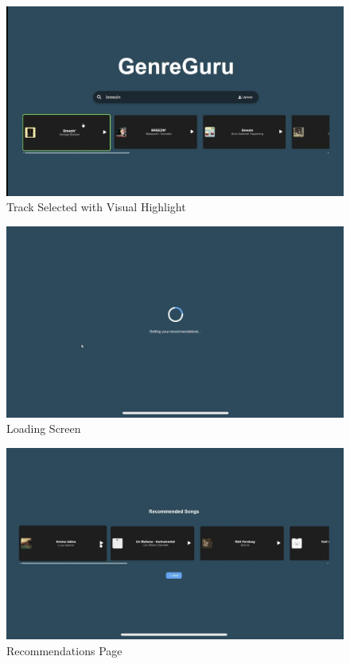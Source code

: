 \documentclass[12pt]{article}
\begin{document}
\begin{figure}[H]
    \centering
    \includegraphics[width=\textwidth]{normans_principles_figures/img3.jpg}
    \caption{Track Selected with Visual Highlight}
    \label{img3}
\end{figure}

\begin{figure}[H]
    \centering
    \includegraphics[width=\textwidth]{normans_principles_figures/img4.jpg}
    \caption{Loading Screen}
    \label{img4}
\end{figure}

\begin{figure}[H]
    \centering
    \includegraphics[width=\textwidth]{normans_principles_figures/img5.jpg}
    \caption{Recommendations Page}
    \label{img5}
\end{figure}
\end{document}
